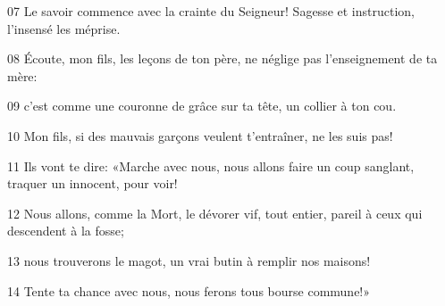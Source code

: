 
07 Le savoir commence avec la crainte du Seigneur! Sagesse et instruction, l’insensé les méprise.

08 Écoute, mon fils, les leçons de ton père, ne néglige pas l’enseignement de ta mère:

09 c’est comme une couronne de grâce sur ta tête, un collier à ton cou.

10 Mon fils, si des mauvais garçons veulent t’entraîner, ne les suis pas!

11 Ils vont te dire: «Marche avec nous, nous allons faire un coup sanglant, traquer un innocent, pour voir!

12 Nous allons, comme la Mort, le dévorer vif, tout entier, pareil à ceux qui descendent à la fosse;

13 nous trouverons le magot, un vrai butin à remplir nos maisons!

14 Tente ta chance avec nous, nous ferons tous bourse commune!»
